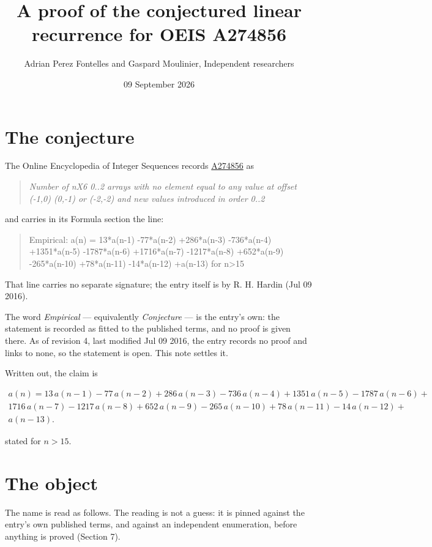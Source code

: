 \documentclass[11pt]{article}
\title{A proof of the conjectured linear recurrence for OEIS A274856}
\author{Adrian Perez Fontelles and Gaspard Moulinier, Independent researchers}
\date{09 September 2026}
\theoremstyle{definition}
\begin{document}
\maketitle
\section{The conjecture}

The Online Encyclopedia of Integer Sequences records \href{https://oeis.org/A274856}{A274856} as

\begin{quote}\itshape Number of nX6 0..2 arrays with no element equal to any value at offset (-1,0) (0,-1) or (-2,-2) and new values introduced in order 0..2\end{quote}

and carries in its Formula section the line:

\begin{quote}\ttfamily Empirical: a(n) = 13*a(n-1) -77*a(n-2) +286*a(n-3) -736*a(n-4) +1351*a(n-5) -1787*a(n-6) +1716*a(n-7) -1217*a(n-8) +652*a(n-9) -265*a(n-10) +78*a(n-11) -14*a(n-12) +a(n-13) for n>15\end{quote}

That line carries no separate signature; the entry itself is by R. H. Hardin (Jul 09 2016).

The word {\itshape Empirical} --- equivalently {\itshape Conjecture} --- is the entry's own: the statement is recorded as fitted to the published terms, and no proof is given there. As of revision 4, last modified Jul 09 2016, the entry records no proof and links to none, so the statement is open. This note settles it.

Written out, the claim is

\begin{multline*} a(n) = 13\,a(n-1) - 77\,a(n-2) + 286\,a(n-3) - 736\,a(n-4) + 1351\,a(n-5) - 1787\,a(n-6) + \\ 1716\,a(n-7) - 1217\,a(n-8) + 652\,a(n-9) - 265\,a(n-10) + 78\,a(n-11) - 14\,a(n-12) + \\ a(n-13). \end{multline*}

stated for $n > 15$.

\section{The object}

The name is read as follows. The reading is not a guess: it is pinned against the entry's own published terms, and against an independent enumeration, before anything is proved (Section 7).
\end{document}
